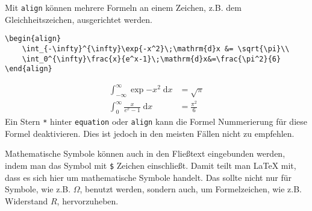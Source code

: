Mit \verb|align| können mehrere Formeln an einem Zeichen, z.B. dem Gleichheitszeichen, ausgerichtet werden. 
\begin{lstlisting}[style=latex]
\begin{align}
	\int_{-\infty}^{\infty}\exp{-x^2}\;\mathrm{d}x &= \sqrt{\pi}\\
	\int_0^{\infty}\frac{x}{e^x-1}\;\mathrm{d}x&=\frac{\pi^2}{6}
\end{align}
\end{lstlisting}
\begin{align}
	\int_{-\infty}^{\infty}\exp{-x^2}\;\mathrm{d}x &= \sqrt{\pi}\\
	\int_0^{\infty}\frac{x}{e^x-1}\;\mathrm{d}x&=\frac{\pi^2}{6}
\end{align}
Ein Stern \verb|*| hinter \verb|equation| oder \verb|align| kann die Formel Nummerierung für diese Formel deaktivieren. Dies ist jedoch in den meisten Fällen nicht zu empfehlen.

Mathematische Symbole können auch in den Fließtext eingebunden werden, indem man das Symbol mit \verb|$| Zeichen einschließt. Damit teilt man \LaTeX{} mit, dass es sich hier um mathematische Symbole handelt. Das sollte nicht nur für Symbole, wie z.B. $\Omega$, benutzt werden, sondern auch, um Formelzeichen, wie z.B. Widerstand $R$, hervorzuheben.


